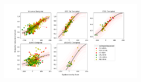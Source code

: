 \documentclass{llncs}
\begin{document}
\begin{figure}[H]
\centering
\begin{subfigure}{\textwidth}
\centering
\includegraphics[width=0.8\textwidth, trim=90 0 110 0, clip]{figures/unit1_allTraj_tad-drcTinyPen1_JMD.png} 
\end{subfigure}


\end{figure}
\end{document}
